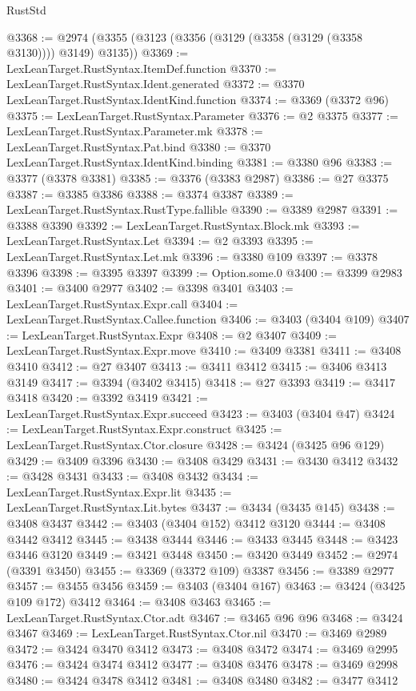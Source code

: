 \begin{lexlean}{RustStd}
\begin{coremodule}
@3368 := @2974 (@3355 (@3123 (@3356 (@3129 (@3358 (@3129 (@3358 @3130)))) @3149) @3135))
@3369 := LexLeanTarget.RustSyntax.ItemDef.function
@3370 := LexLeanTarget.RustSyntax.Ident.generated
@3372 := @3370 LexLeanTarget.RustSyntax.IdentKind.function
@3374 := @3369 (@3372 @96)
@3375 := LexLeanTarget.RustSyntax.Parameter
@3376 := @2 @3375
@3377 := LexLeanTarget.RustSyntax.Parameter.mk
@3378 := LexLeanTarget.RustSyntax.Pat.bind
@3380 := @3370 LexLeanTarget.RustSyntax.IdentKind.binding
@3381 := @3380 @96
@3383 := @3377 (@3378 @3381)
@3385 := @3376 (@3383 @2987)
@3386 := @27 @3375
@3387 := @3385 @3386
@3388 := @3374 @3387
@3389 := LexLeanTarget.RustSyntax.RustType.fallible
@3390 := @3389 @2987
@3391 := @3388 @3390
@3392 := LexLeanTarget.RustSyntax.Block.mk
@3393 := LexLeanTarget.RustSyntax.Let
@3394 := @2 @3393
@3395 := LexLeanTarget.RustSyntax.Let.mk
@3396 := @3380 @109
@3397 := @3378 @3396
@3398 := @3395 @3397
@3399 := Option.some.{0}
@3400 := @3399 @2983
@3401 := @3400 @2977
@3402 := @3398 @3401
@3403 := LexLeanTarget.RustSyntax.Expr.call
@3404 := LexLeanTarget.RustSyntax.Callee.function
@3406 := @3403 (@3404 @109)
@3407 := LexLeanTarget.RustSyntax.Expr
@3408 := @2 @3407
@3409 := LexLeanTarget.RustSyntax.Expr.move
@3410 := @3409 @3381
@3411 := @3408 @3410
@3412 := @27 @3407
@3413 := @3411 @3412
@3415 := @3406 @3413 @3149
@3417 := @3394 (@3402 @3415)
@3418 := @27 @3393
@3419 := @3417 @3418
@3420 := @3392 @3419
@3421 := LexLeanTarget.RustSyntax.Expr.succeed
@3423 := @3403 (@3404 @47)
@3424 := LexLeanTarget.RustSyntax.Expr.construct
@3425 := LexLeanTarget.RustSyntax.Ctor.closure
@3428 := @3424 (@3425 @96 @129)
@3429 := @3409 @3396
@3430 := @3408 @3429
@3431 := @3430 @3412
@3432 := @3428 @3431
@3433 := @3408 @3432
@3434 := LexLeanTarget.RustSyntax.Expr.lit
@3435 := LexLeanTarget.RustSyntax.Lit.bytes
@3437 := @3434 (@3435 @145)
@3438 := @3408 @3437
@3442 := @3403 (@3404 @152) @3412 @3120
@3444 := @3408 @3442 @3412
@3445 := @3438 @3444
@3446 := @3433 @3445
@3448 := @3423 @3446 @3120
@3449 := @3421 @3448
@3450 := @3420 @3449
@3452 := @2974 (@3391 @3450)
@3455 := @3369 (@3372 @109) @3387
@3456 := @3389 @2977
@3457 := @3455 @3456
@3459 := @3403 (@3404 @167)
@3463 := @3424 (@3425 @109 @172) @3412
@3464 := @3408 @3463
@3465 := LexLeanTarget.RustSyntax.Ctor.adt
@3467 := @3465 @96 @96
@3468 := @3424 @3467
@3469 := LexLeanTarget.RustSyntax.Ctor.nil
@3470 := @3469 @2989
@3472 := @3424 @3470 @3412
@3473 := @3408 @3472
@3474 := @3469 @2995
@3476 := @3424 @3474 @3412
@3477 := @3408 @3476
@3478 := @3469 @2998
@3480 := @3424 @3478 @3412
@3481 := @3408 @3480
@3482 := @3477 @3412

\end{coremodule}
\end{lexlean}
